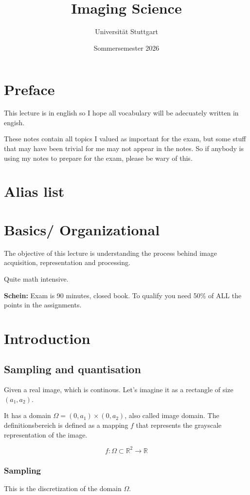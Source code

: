 \documentclass{article}
\begin{document}
\title{Imaging Science}
\date{Sommersemester 2026}
\author{Universität Stuttgart}
\maketitle
\tableofcontents
\newpage

\section{Preface}
This lecture is in english so I hope all vocabulary will be adecuately written in engish.

These notes contain all topics I valued as important for the exam, but some stuff that may have been trivial for me may not appear in the notes. So if anybody is using my notes to 
prepare for the exam, please be wary of this.

\section{Alias list}

\section{Basics/ Organizational}
The objective of this lecture is understanding the 
process behind image acquisition, representation and 
processing.

Quite math intensive.

\textbf{Schein:} Exam is 90 minutes, closed book. To qualify you need
50\% of ALL the points in the assignments. 

\section{Introduction}
\subsection{Sampling and quantisation}
Given a real image, which is continous. Let's imagine it as a rectangle of size $(a_1,a_2)$.

It has a domain $\Omega = (0,a_1) \times (0, a_2)$, also called image domain. The definitionsbereich is defined as 
a mapping $f$ that represents the grayscale representation of the image.

\[f: \Omega \subset \mathbb{R}^2 \to \mathbb{R} \]

\subsubsection{Sampling}
This is the discretization of the domain $\Omega$.
\end{document}
